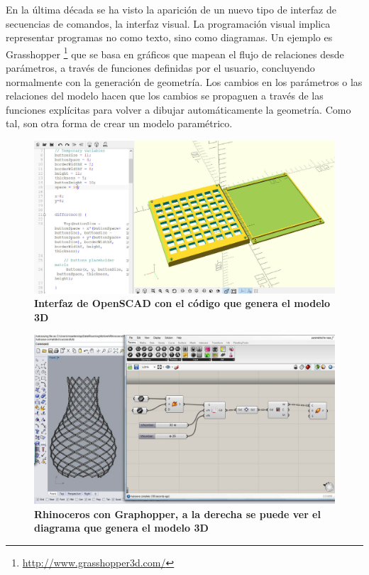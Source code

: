 En la última década se ha visto la aparición de un nuevo tipo de interfaz de secuencias de comandos, la interfaz visual. La programación visual implica representar programas no como texto, sino como diagramas. Un ejemplo es Grasshopper \footnote{ \url{http://www.grasshopper3d.com/}} que se basa en gráficos que mapean el flujo de relaciones desde parámetros, a través de funciones definidas por el usuario, concluyendo normalmente con la generación de geometría. Los cambios en los parámetros o las relaciones del modelo hacen que los cambios se propaguen a través de las funciones explícitas para volver a dibujar automáticamente la geometría. Como tal, son otra forma de crear un modelo paramétrico.


\begin{figure}[h]
\includegraphics[width=14cm]{Img/CPD/openscadc.jpg}
\centering
\caption{\textbf{\footnotesize{Interfaz de OpenSCAD con el código que genera el modelo 3D}}}
\end{figure}

\begin{figure}[h]
\includegraphics[width=14cm]{Img/CPD/rhinoc.jpg}
\centering
\caption{\textbf{\footnotesize{Rhinoceros con Graphopper, a la derecha se puede ver el diagrama que genera el modelo 3D}}}
\end{figure}


